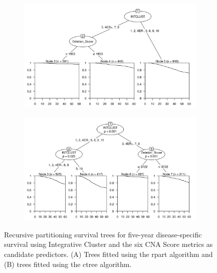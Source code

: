 \begin{figure}[!h]
\centering

\vspace{0.5cm}

\begin{subfigure}{\textwidth}
\subcaption{}
\includegraphics[width=1\textwidth]{../figures/Chapter_3/PartyKit_Survival_Score_FiveYearDSS_INTCLUST.png}
\end{subfigure}

\vspace{2cm}

\begin{subfigure}{\textwidth}
\subcaption{}
\includegraphics[width=1\textwidth]{../figures/Chapter_3/Ctree_Survival_Score_FiveYearDSS_INTCLUST.png}
\end{subfigure}

\vspace{0.5cm}

\caption[Recursive partitioning survival trees for five-year disease-specific survival using Integrative Cluster and the six CNA Score metrics as candidate predictors.]{Recursive partitioning survival trees for five-year disease-specific survival using Integrative Cluster and the six CNA Score metrics as candidate predictors. (A) Trees fitted using the rpart algorithm and (B) trees fitted using the ctree algorithm.}
\label{fig:INTCLUST_CNA_Score_FiveYearDSS}
\end{figure}

